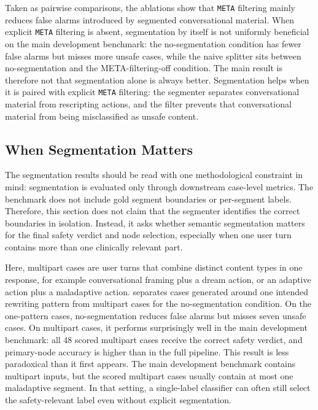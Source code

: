 Taken as pairwise comparisons, the ablations show that \texttt{META} filtering mainly
reduces false alarms introduced by segmented conversational material. When explicit
\texttt{META} filtering is absent, segmentation by itself is not uniformly beneficial on
the main development benchmark: the no-segmentation condition has fewer false alarms
but misses more unsafe cases, while the naive splitter sits between no-segmentation and
the META-filtering-off condition. The main result is therefore not that segmentation
alone is always better. Segmentation helps when it is paired with explicit
\texttt{META} filtering: the segmenter separates conversational material from
rescripting actions, and the filter prevents that conversational material from being
misclassified as unsafe content.

\subsection{When Segmentation Matters}

The segmentation results should be read with one methodological constraint in mind:
segmentation is evaluated only through downstream case-level metrics. The benchmark
does not include gold segment boundaries or per-segment labels. Therefore, this section
does not claim that the segmenter identifies the correct boundaries in isolation.
Instead, it asks whether semantic segmentation matters for the final safety verdict and
node selection, especially when one user turn contains more than one clinically relevant
part.

Here, multipart cases are user turns that combine distinct content types in one
response, for example conversational framing plus a dream action, or an adaptive action
plus a maladaptive action.  separates cases generated around one intended
rewriting pattern from multipart cases for the no-segmentation condition. On the
one-pattern cases, no-segmentation reduces false alarms but misses seven unsafe cases.
On multipart cases, it performs surprisingly well in the main development benchmark:
all 48 scored multipart cases receive the correct safety verdict, and primary-node
accuracy is higher than in the full pipeline. This result is less paradoxical than it
first appears. The main development benchmark contains multipart inputs, but the scored
multipart cases usually contain at most one maladaptive segment. In that setting, a
single-label classifier can often still select the safety-relevant label even without
explicit segmentation.

